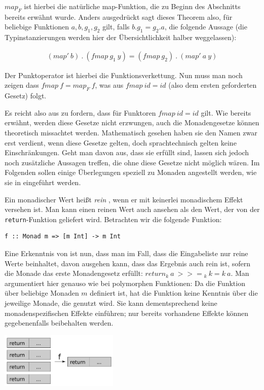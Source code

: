 \documentclass[11pt]{article} %
\begin{document}
$map_F$ ist hierbei die natürliche map-Funktion, die zu Beginn des Abschnitts bereits erwähnt wurde.
Anders ausgedrückt sagt dieses Theorem also, für beliebige Funktionen $a, b, g_1, g_2$ gilt, falls $b . g_1 = g_2 . a$, die folgende Aussage
(die Typinstanzierungen werden hier der Übersichtlichkeit halber weggelassen):

\begin{align*}
(map'\ b)\ .\ (fmap\ g_1\ y) = (fmap\ g_2)\ .\ (map'\ a\ y)
\end{align*}

Der Punktoperator ist hierbei die Funktionsverkettung. Nun muss man noch zeigen dass $fmap\ f = map_F\ f$, was aus $fmap\ id = id$ (also dem ersten geforderten Gesetz) folgt. 

Es reicht also aus zu fordern, dass für Funktoren $fmap\ id = id$ gilt. Wie bereits erwähnt, werden diese Gesetze nicht
erzwungen, auch die Monadengesetze können theoretisch missachtet werden. Mathematisch gesehen haben sie den
Namen zwar erst verdient, wenn diese Gesetze gelten, doch sprachtechnisch gelten keine Einschränkungen.
Geht man davon aus, dass sie erfüllt sind, lassen sich jedoch noch zusätzliche Aussagen treffen, die ohne diese Gesetze
nicht möglich wären. Im Folgenden sollen einige Überlegungen speziell zu Monaden angestellt werden, wie sie in \cite{voigtlander}
eingeführt werden.

Ein monadischer Wert heißt \textit{rein} , wenn er mit keinerlei monadischem Effekt versehen ist. Man
kann einen reinen Wert auch ansehen als den Wert, der von der \texttt{return}-Funktion geliefert wird. Betrachten wir die
folgende Funktion:

\begin{verbatim}
f :: Monad m => [m Int] -> m Int
\end{verbatim}

Eine Erkenntnis von \cite{voigtlander} ist nun, dass man im Fall, dass die Eingabeliste nur reine Werte beinhaltet, davon ausgehen
kann, dass das Ergebnis auch rein ist, sofern die Monade das erste Monadengesetz erfüllt: $return_k\ a\ {>>=}_k\ k = k\ a$. Man argumentiert hier genauso wie bei polymorphen Funktionen: Da die Funktion über
beliebige Monaden $m$ definiert ist, hat die Funktion keine Kenntnis über die jeweilige Monade, die genutzt wird.
Sie kann dementsprechend keine monadenspezifischen Effekte einführen; nur bereits vorhandene
Effekte können gegebenenfalls beibehalten werden.

\includegraphics[height=100px]{purity-preservation}
\end{document}
